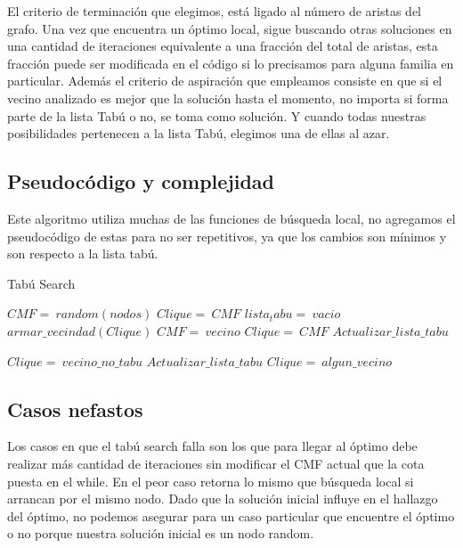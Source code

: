 El criterio de terminación que elegimos, está ligado al número de aristas del grafo. Una vez que encuentra un óptimo local, sigue buscando otras soluciones en una cantidad de iteraciones equivalente a una fracción del total de aristas, esta fracción puede ser modificada en el código si lo precisamos para alguna familia en particular.
Además el criterio de aspiración que empleamos consiste en que si el vecino analizado es mejor que la solución hasta el momento, no importa si forma parte de la lista Tabú o no, se toma como solución. Y cuando todas nuestras posibilidades pertenecen a la lista Tabú, elegimos una de ellas al azar.

\subsection{Pseudoc\'odigo y complejidad}
Este algoritmo utiliza muchas de las funciones de búsqueda local, no agregamos el pseudocódigo de estas para no ser repetitivos, ya que los cambios son mínimos y son respecto a la lista tabú.

\begin{algorithm}
	\caption{Tabú Search}\label{tabu}
	\begin{algorithmic}[1]
		\State $CMF=\ random(nodos)$	
		\State $Clique=\ CMF$
		\State $lista_tabu=\ vacio$
			\State $armar\_vecindad(Clique)$
				 
					\State $CMF=\ vecino$
					\State $Clique=\ CMF$ 
					\State $Actualizar\_lista\_tabu$
				\EndIf
			\EndFor
		\EndWhile

				\State $Clique=\ vecino\_no\_tabu$
				\State $Actualizar\_lista\_tabu$
			\Else
				\State $Clique=\ algun\_vecino$
			\EndIf
		\EndIf
	\EndProcedure
\end{algorithmic}
\end{algorithm}


\subsection{Casos nefastos}
Los casos en que el tabú search falla son los que para llegar al óptimo debe realizar más cantidad de iteraciones sin modificar el CMF actual que la cota puesta en el while. En el peor caso retorna lo mismo que búsqueda local si arrancan por el mismo nodo. Dado que la solución inicial influye en el hallazgo del óptimo, no podemos asegurar para un caso particular que encuentre el óptimo o no porque nuestra solución inicial es un nodo random.






